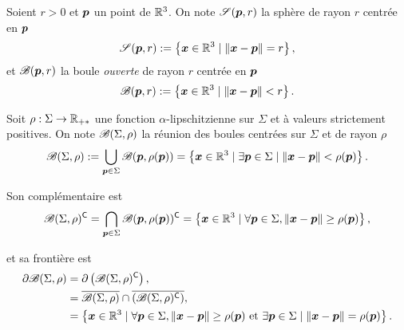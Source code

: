 \def\p{\vit{p}}
\def\q{\vit{q}}
Soient $r> 0$ et $\p$ un point de $\mathbb{R}^3$. 
On note $\sphere{\p}{r}$ la sphère de rayon $r$ centrée en $\p$
\begin{equation}
    \sphere{\p}{r} := \left\{ 
        \bx \in \reals^3 \mid \normtwo{\bx - \p} = r
    \right\},
\end{equation}
et $\ball{\p}{r}$ la boule \textit{ouverte} de rayon $r$ centrée en $\p$
\begin{equation}
    \ball{\p}{r} := \left\{ 
        \bx \in \reals^3 \mid \normtwo{\bx - \p} < r
    \right\}.
\end{equation}

Soit $\rho : \Sigma \to \mathbb{R}_{+*}$ une fonction $\alpha$-lipschitzienne sur $\Sigma$ et à valeurs strictement positives. 
On note $\mathscr{B}(\Sigma,\rho)$ la réunion des boules centrées sur $\Sigma$ et de rayon $\rho$
\begin{equation}
    \ball{\Sigma}{\rho} := \bigcup_{\p \in \Sigma} \ball{\p}{\rho(\p)}
    = \left\{
        \bx \in \reals^3 \mid \exists \p \in \Sigma \mid \normtwo{\bx - \p} < \rho(\p)
    \right\}.
\end{equation}

Son complémentaire est
\begin{equation}
    \complement{\ball{\Sigma}{\rho}} = \bigcap_{\p \in \Sigma} \complement{\ball{\p}{\rho(\p)}}
    = \left\{
        \bx \in \reals^3 \mid \forall \p \in \Sigma, \normtwo{\bx - \p} \geq \rho(\p)
    \right\},
\end{equation}

et sa frontière est
\begin{align}
    \boundary{\ball{\Sigma}{\rho}} 
    &= \boundary{ \left(\complement{\ball{\Sigma}{\rho}}\right) } ,\nonumber\\
    &= \closure{\ball{\Sigma}{\rho}} \cap 
        \closure{ \left(\complement{\ball{\Sigma}{\rho}}\right) } ,\nonumber\\
     &= \left\{
        \bx \in \reals^3 
        \mid \forall \p \in \Sigma, \normtwo{\bx - \p} \geq \rho(\p) 
        \text{ et }
        \exists \p \in \Sigma \mid \normtwo{\bx - \p} = \rho(\p)
    \right\}.
\end{align}

\par\bigskip

